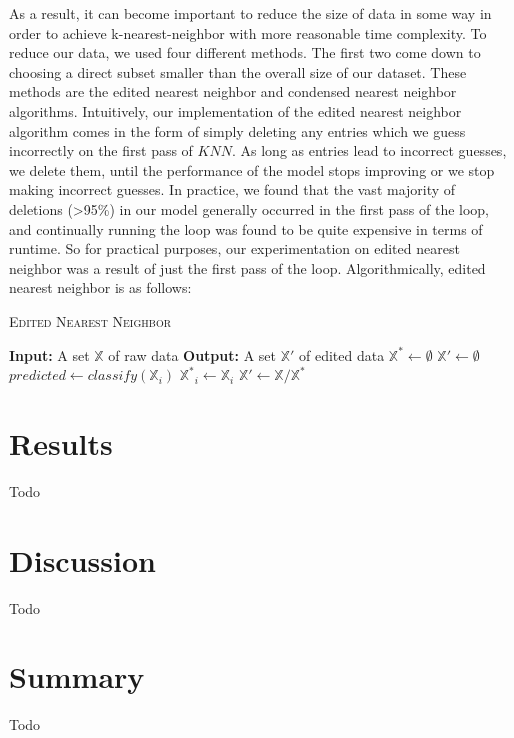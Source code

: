 \documentclass[twoside,11pt]{article}
\begin{document}
As a result, it can become important to reduce the size of data in some way in order to achieve k-nearest-neighbor with more reasonable time complexity. To reduce our data, we used
four different methods. The first two come down to choosing a direct subset smaller than the overall size of our dataset. These methods are the edited nearest neighbor and condensed
nearest neighbor algorithms. Intuitively, our implementation of the edited nearest neighbor algorithm comes in the form of simply deleting any entries which we guess incorrectly on the
first pass of $KNN$. As long as entries lead to incorrect guesses, we delete them, until the performance of the model stops improving or we stop making incorrect guesses.
In practice, we found that the vast majority of deletions (>95\%) in our model generally occurred in the first pass of the loop, and continually running the loop was found to be quite expensive in terms of runtime.
So for practical purposes, our experimentation on edited nearest neighbor was a result of just the first pass of the loop.
Algorithmically, edited nearest neighbor is as follows:
\begin{algorithm}
\begin{algorithmic}
\caption{\textsc{Edited Nearest Neighbor}}
\STATE \textbf{Input:} A set $\mathbb{X}$ of raw data
\STATE \textbf{Output:} A set $\mathbb{X}'$ of edited data
\STATE $\mathbb{X}^* \gets \emptyset$
\STATE $\mathbb{X}' \gets \emptyset$
\STATE $predicted \gets classify(\mathbb{X}_i)$
\STATE $\mathbb{X^*}_i \gets \mathbb{X}_i$
\ENDIF
\ENDFOR
\STATE $\mathbb{X'} \gets \mathbb{X}/\mathbb{X^*}$
\ENDWHILE
\end{algorithmic}
\end{algorithm}



\section{Results}
Todo

\section{Discussion}
Todo


\section{Summary}
Todo
\end{document}
